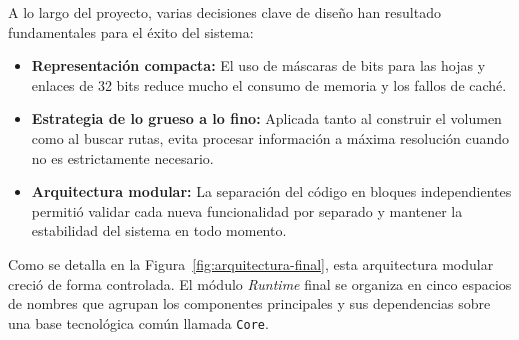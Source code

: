 A lo largo del proyecto, varias decisiones clave de diseño han resultado fundamentales para el éxito del sistema:

\begin{itemize}
  \item \textbf{Representación compacta:} El uso de máscaras de bits para las hojas y enlaces de 32 bits reduce mucho el consumo de memoria y los fallos de caché.
  \item \textbf{Estrategia de lo grueso a lo fino:} Aplicada tanto al construir el volumen como al buscar rutas, evita procesar información a máxima resolución cuando no es estrictamente necesario.
  \item \textbf{Arquitectura modular:} La separación del código en bloques independientes permitió validar cada nueva funcionalidad por separado y mantener la estabilidad del sistema en todo momento.
\end{itemize}

Como se detalla en la Figura~\ref{fig:arquitectura-final}, esta arquitectura modular creció de forma controlada. El módulo \textit{Runtime} final se organiza en cinco espacios de nombres que agrupan los componentes principales y sus dependencias sobre una base tecnológica común llamada \texttt{Core}.

